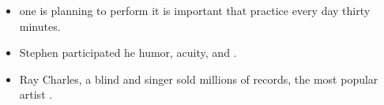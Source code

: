 \begin{itemize}
\item \begin{inparaenum}[A]
  one is planning to perform   it is important that  practice every day  thirty minutes. 
\end{inparaenum}

\item \begin{inparaenum}[A]
 Stephen participated  he  humor, acuity, and . 
\end{inparaenum}

\item \begin{inparaenum}[A]
Ray Charles, a blind  and singer  sold millions of records,  the most popular artist . 
\end{inparaenum}

\end{itemize}
